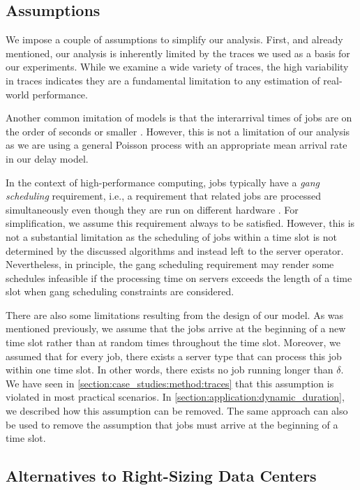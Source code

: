 \subsection{Assumptions}

We impose a couple of assumptions to simplify our analysis. First, and already mentioned, our analysis is inherently limited by the traces we used as a basis for our experiments. While we examine a wide variety of traces, the high variability in traces indicates they are a fundamental limitation to any estimation of real-world performance.

Another common imitation of models is that the interarrival times of jobs are on the order of seconds or smaller \cite{Amvrosiadis2018}. However, this is not a limitation of our analysis as we are using a general Poisson process with an appropriate mean arrival rate in our delay model.

In the context of high-performance computing, jobs typically have a \emph{gang scheduling} requirement, i.e., a requirement that related jobs are processed simultaneously even though they are run on different hardware \cite{Amvrosiadis2018}. For simplification, we assume this requirement always to be satisfied. However, this is not a substantial limitation as the scheduling of jobs within a time slot is not determined by the discussed algorithms and instead left to the server operator. Nevertheless, in principle, the gang scheduling requirement may render some schedules infeasible if the processing time on servers exceeds the length of a time slot when gang scheduling constraints are considered.

There are also some limitations resulting from the design of our model. As was mentioned previously, we assume that the jobs arrive at the beginning of a new time slot rather than at random times throughout the time slot. Moreover, we assumed that for every job, there exists a server type that can process this job within one time slot. In other words, there exists no job running longer than $\delta$. We have seen in \autoref{section:case_studies:method:traces} that this assumption is violated in most practical scenarios. In \autoref{section:application:dynamic_duration}, we described how this assumption can be removed. The same approach can also be used to remove the assumption that jobs must arrive at the beginning of a time slot.

\subsection{Alternatives to Right-Sizing Data Centers}

